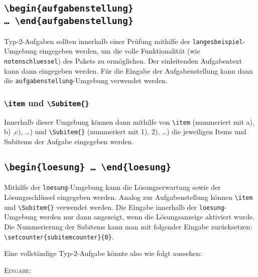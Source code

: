 \documentclass[a4paper,12pt]{article}
\begin{document}
\subsection{\texttt{\textbackslash begin\{aufgabenstellung\} \ldots\ \textbackslash end\{aufgabenstellung\}}}
Typ-2-Aufgaben sollten innerhalb einer Prüfung mithilfe der \texttt{langesbeispiel}-Umgebung eingegeben werden, um die volle Funktionalität (wie \texttt{notenschluessel}) des Pakets zu ermöglichen. Der einleitenden Aufgabentext kann dann eingegeben werden. Für die Eingabe der Aufgabenstellung kann dann die \texttt{aufgabenstellung}-Umgebung verwendet werden.\leer

\subsubsection{\texttt{\textbackslash item} und \texttt{\textbackslash Subitem\{\}}}
Innerhalb dieser Umgebung können dann mithilfe von \texttt{\textbackslash item} (nummeriert mit a), b) ,c), \ldots) und \texttt{\textbackslash Subitem\{\}} (nummeriert mit 1), 2), \ldots) die jeweiligen Items und Subitems der Aufgabe eingegeben werden. \leer


\subsection{\texttt{\textbackslash begin\{loesung\} \ldots\ \textbackslash end\{loesung\}}}
Mithilfe der \texttt{loesung}-Umgebung kann die Lösungserwartung sowie der Lösungsschlüssel eingegeben werden. Analog zur Aufgabenstellung können \texttt{\textbackslash item} und \texttt{\textbackslash Subitem\{\}} verwendet werden. Die Eingabe innerhalb der \texttt{loesung}-Umgebung werden nur dann angezeigt, wenn die Lösungsanzeige aktiviert wurde. Die Nummerierung der Subitems kann man mit folgender Eingabe zurücksetzen: \texttt{\textbackslash setcounter\{subitemcounter\}\{0\}}.\leer

Eine vollständige Typ-2-Aufgabe könnte also wie folgt aussehen:

\textsc{Eingabe:}
\end{document}
